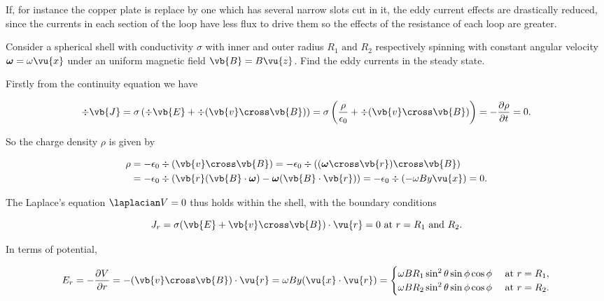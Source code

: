 \documentclass[english,a4paper,12pt]{report}
\begin{document}
If, for instance the copper plate is replace by one which has several narrow slots cut in it, the eddy current effects are drastically reduced, since the currents in each section of the loop have less flux to drive them so the effects of the resistance of each loop are greater. 

{Consider a spherical shell with conductivity \(\sigma \) with inner and outer radius \(R_1 \text { and } R_2 \) respectively spinning with constant angular velocity \(\boldsymbol{\omega } =  \omega \vu{x} \) under an uniform magnetic field \(\vb{B} = B \vu{z} \). Find the eddy currents in the steady state.  }
{Firstly from the continuity equation we have

\begin{equation}
    \div{\vb{J} } = \sigma \left( \div{\vb{E} } + \div{(\vb{v} \cross \vb{B} )}   \right) = \sigma \left( \frac{\rho }{\epsilon_0 } + \div{(\vb{v} \cross \vb{B} )}   \right) = -\frac{\partial \rho }{\partial t} = 0.
\end{equation}

So the charge density \(\rho \) is given by 

\begin{equation}
    \begin{aligned}
    \rho &= -\epsilon_0 \div{(\vb{v} \cross \vb{B} )} = -\epsilon_0 \div{((\boldsymbol{\omega } \cross \vb{r} )\cross \vb{B} )} \\ 
    &= -\epsilon_0 \div{(\vb{r} (\vb{B} \cdot \boldsymbol{\omega } ) - \boldsymbol{\omega }(\vb{B} \cdot \vb{r} ) )} =  - \epsilon_0 \div{(-\omega By \vu{x} )} = 0. 
    \end{aligned}
\end{equation}

The Laplace's equation \(\laplacian V = 0\) thus holds within the shell, with the boundary conditions

\begin{equation}
    J_{r} = \sigma (\vb{E} +\vb{v} \cross \vb{B} ) \cdot \vu{r} = 0 \text{ at } r=  R_1 \text { and } R_2 .  
\end{equation}

In terms of potential, 

\begin{equation}
    E_{r} = -\frac{\partial V}{\partial r} = -(\vb{v} \cross \vb{B} ) \cdot \vu{r} = \omega By(\vu{x} \cdot \vu{r} )= \begin{cases}
        \omega BR_1 \sin ^2\theta \sin \phi \cos \phi  &\text{ at } r = R_1 ,\\
        \omega BR_2 \sin ^2\theta \sin \phi \cos \phi  &\text{ at } r = R_2 .
    \end{cases} 
\end{equation}

}
\end{document}
